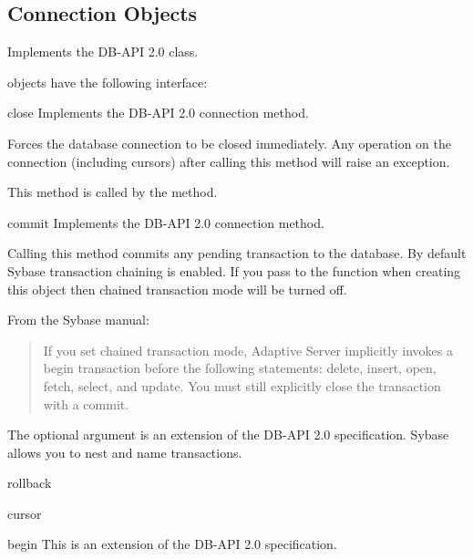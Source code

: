 \subsection{Connection Objects}

Implements the DB-API 2.0  class.

 objects have the following interface:

\begin{methoddesc}[Connection]{close}{}
Implements the DB-API 2.0 connection  method.

Forces the database connection to be closed immediately.  Any
operation on the connection (including cursors) after calling this
method will raise an exception.

This method is called by the  method.
\end{methoddesc}

\begin{methoddesc}[Connection]{commit}{}
Implements the DB-API 2.0 connection  method.

Calling this method commits any pending transaction to the database.
By default Sybase transaction chaining is enabled.  If you pass
 to the  function when
creating this  object then chained transaction mode
will be turned off.

From the Sybase manual:
\begin{quote}
If you set chained transaction mode, Adaptive Server implicitly
invokes a begin transaction before the following statements: delete,
insert, open, fetch, select, and update. You must still explicitly
close the transaction with a commit.
\end{quote}

The optional  argument is an extension of the DB-API 2.0
specification.  Sybase allows you to nest and name transactions.
\end{methoddesc}

\begin{methoddesc}[Connection]{rollback}{}
\end{methoddesc}

\begin{methoddesc}[Connection]{cursor}{}
\end{methoddesc}

\begin{methoddesc}[Connection]{begin}{}
This is an extension of the DB-API 2.0 specification.
\end{methoddesc}

